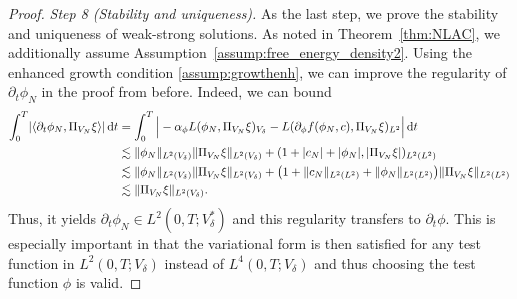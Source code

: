 \documentclass[]{article}
\newcommand{\dt}{\,\textup{d}t}
\DeclarePairedDelimiter{\abs}{\lvert}{\rvert}
\DeclarePairedDelimiter{\norm}{\lVert}{\rVert}
\begin{document}
\begin{proof}
	\noindent\emph{Step 8 (Stability and uniqueness).}
	As the last step, we prove the stability and uniqueness of weak-strong solutions. As noted in Theorem~\ref{thm:NLAC}, we additionally assume Assumption~\ref{assump:free_energy_density2}. Using the enhanced growth condition \eqref{assump:growthenh}, we can improve the regularity of $\partial_t \phi_N$ in the proof from before. Indeed, we can bound
	$$\begin{aligned}
		\int_0^T \abs{\langle \partial_t \phi_N, \Pi_{V_N} \xi \rangle} \dt  &= \int_0^T \Big|-\alpha_\phi L (\phi_N,\Pi_{V_N} \xi)_{V_\delta} - L (\partial_\phi f(\phi_N,c),\Pi_{V_N} \xi)_{L^2}\Big| \dt  \\
		&\lesssim  \norm{\phi_N}_{L^2(V_\delta)} \|\Pi_{V_N} \xi\|_{L^2(V_\delta)} +  (1+\abs{c_N}+\abs{\phi_N},|\Pi_{V_N} \xi|)_{L^2(L^2)} \\
		&\lesssim \norm{\phi_N}_{L^2(V_\delta)} \|\Pi_{V_N} \xi\|_{L^2(V_\delta)} + \bigl(1+\norm{c_N}_{L^2(L^2)}+\norm{\phi_N}_{L^2(L^2)}\bigr) \|\Pi_{V_N} \xi\|_{L^2(L^2)} \\
		&\lesssim \|\Pi_{V_N} \xi\|_{L^2(V_\delta)}.
	\end{aligned}$$
	Thus, it yields $\partial_t \phi_N \in L^2(0,T;V_\delta^*)$ and this regularity transfers to $\partial_t \phi$. This is especially important in that the variational form is then satisfied for any test function in $L^2(0,T;V_\delta)$ instead of $L^4(0,T;V_\delta)$ and thus choosing the test function $\phi$ is valid.
	

\end{proof}
\end{document}
